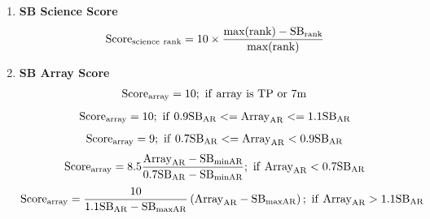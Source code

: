 \documentclass[a4paper,10pt,english]{sphinxmanual}
\begin{document}
\begin{enumerate}
\item {} 
\textbf{SB Science Score}
\begin{gather}
\begin{split}\rm{Score}_{\rm{science\ rank}} =
10 \times \frac{\rm{max(rank)} - \rm{SB}_{\rm{rank}}}{\rm{max(rank)}}\end{split}\notag
\end{gather}
\item {} 
\textbf{SB Array Score}
\label{algorithm:equation-tp}\begin{gather}
\begin{split}\rm{Score}_{\rm{array}} = 10 ; \rm{\ if\ array\ is\ TP\ or\ 7m}\end{split}\label{algorithm-tp}
\end{gather}\label{algorithm:equation-match}\begin{gather}
\begin{split}\rm{Score}_{\rm{array}} = 10 ; \rm{\ if\ } 0.9 \rm{SB}_{\rm{AR}}
        <= \rm{Array}_{\rm{AR}} <= 1.1 \rm{SB}_{\rm{AR}}\end{split}\label{algorithm-match}
\end{gather}\label{algorithm:equation-low}\begin{gather}
\begin{split}\rm{Score}_{\rm{array}} = 9 ; \rm{\ if\ } 0.7 \rm{SB}_{\rm{AR}}
       <= \rm{Array}_{\rm{AR}} < 0.9 \rm{SB}_{\rm{AR}}\end{split}\label{algorithm-low}
\end{gather}\label{algorithm:equation-toolow}\begin{gather}
\begin{split}\rm{Score}_{\rm{array}} = 8.5\frac{\rm{Array}_{\rm{AR}} - \rm{SB}_{\rm{minAR}}}{0.7\rm{SB}_{\rm{AR}} - \rm{SB}_{\rm{minAR}}}
       ; \rm{\ if\ } \rm{Array}_{\rm{AR}} < 0.7 \rm{SB}_{\rm{AR}}\end{split}\label{algorithm-toolow}
\end{gather}\label{algorithm:equation-high}\begin{gather}
\begin{split}\rm{Score}_{\rm{array}} = \frac{10}{1.1\rm{SB}_{\rm{AR}} - \rm{SB}_{\rm{maxAR}}} \left(\rm{Array}_{\rm{AR}} - \rm{SB}_{\rm{maxAR}}\right)
       ; \rm{\ if\ } \rm{Array}_{\rm{AR}} > 1.1 \rm{SB}_{\rm{AR}}\end{split}\label{algorithm-high}
\end{gather}\begin{figure}[htbp]
\centering
\capstart


\end{figure}
\end{enumerate}
\end{document}
